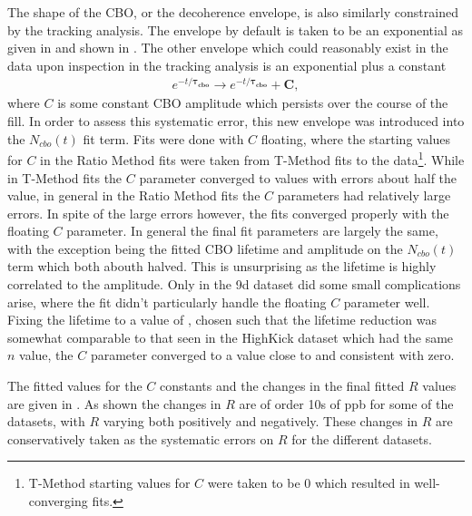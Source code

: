 The shape of the CBO, or the decoherence envelope, is also similarly constrained by the tracking analysis. The envelope by default is taken to be an exponential as given in  and shown in . The other envelope which could reasonably exist in the data upon inspection in the tracking analysis is an exponential plus a constant
    \begin{align}
        e^{-t/\boldsymbol{\tau_{cbo}}} \rightarrow e^{-t/\boldsymbol{\tau_{cbo}}} + \boldsymbol{C},
    \end{align}
where $C$ is some constant CBO amplitude which persists over the course of the fill. In order to assess this systematic error, this new envelope was introduced into the $N_{cbo}(t)$ fit term. Fits were done with $C$ floating, where the starting values for $C$ in the Ratio Method fits were taken from T-Method fits to the data\footnote{T-Method starting values for $C$ were taken to be 0 which resulted in well-converging fits.}. While in T-Method fits the $C$ parameter converged to values with errors about half the value, in general in the Ratio Method fits the $C$ parameters had relatively large errors. In spite of the large errors however, the fits converged properly with the floating $C$ parameter. In general the final fit parameters are largely the same, with the exception being the fitted CBO lifetime and amplitude on the $N_{cbo}(t)$ term which both abouth halved. This is unsurprising as the lifetime is highly correlated to the amplitude. Only in the 9d dataset did some small complications arise, where the fit didn't particularly handle the floating $C$ parameter well. Fixing the lifetime to a value of , chosen such that the lifetime reduction was somewhat comparable to that seen in the HighKick dataset which had the same $n$ value, the $C$ parameter converged to a value close to and consistent with zero.


The fitted values for the $C$ constants and the changes in the final fitted $R$ values are given in . As shown the changes in $R$ are of order 10s of ppb for some of the datasets, with $R$ varying both positively and negatively. These changes in $R$ are conservatively taken as the systematic errors on $R$ for the different datasets.


